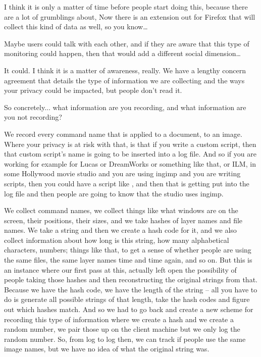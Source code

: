 { I think it is only a matter of time before people start doing
this, because there are a lot of grumblings about,  Now there
is an extension out for Firefox that will collect this kind of data as
well, so you know{\dots}\par

 Maybe users could talk with each other, and if they are aware that
this type of monitoring could happen, then that would add a different
social dimension{\dots}

 It could. I think it is a matter of awareness, really. We have a
lengthy concern agreement that details the type of information we are
collecting and the ways your privacy could be impacted, but people
don't read it.\par

 So concretely... what information are you recording, and what
information are you not recording?\par

 We record every command name that is applied to a document, to an
image. Where your privacy is at risk with that, is that if you write a
custom script, then that custom script's name is going to be inserted
into a log file. And so if you are working for example for Lucas or
DreamWorks or something like that, or ILM, in some Hollywood movie
studio and you are using ingimp and you are writing scripts, then you
could have a script like , and then that is
getting put into the log file and then people are going to know that
the studio uses ingimp.\par

We collect command names, we collect things like what windows are on the
screen, their positions, their sizes, and we take hashes of layer names
and file names. We take a string and then we create a hash code for it,
and we also collect information about how long is this string, how many
alphabetical characters, numbers; things like that, to get a sense of
whether people are using the same files, the same layer names time and
time again, and so on. But this is an instance where our first pass at
this, actually left open the possibility of people taking those hashes
and then reconstructing the original strings from that. Because we have
the hash code, we have the length of the string {--} all you have to do
is generate all possible strings of that length, take the hash codes
and figure out which hashes match. And so we had to go back and create
a new scheme for recording this type of information where we create a
hash and we create a random number, we pair those up on the client
machine but we only log the random number. So, from log to log then, we
can track if people use the same image names, but we have no idea of
what the original string was.\par

}
